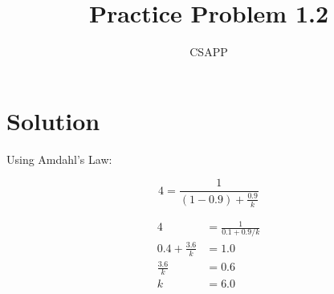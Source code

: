 \documentclass{article}
\title{Practice Problem 1.2}
\author{CSAPP}
\begin{document}
\maketitle

\section*{Solution}

Using Amdahl's Law:

\begin{equation*}
    4 = \frac{1}{(1 - 0.9) + \frac{0.9}{k}}
\end{equation*}

\begin{align*}
    4 &= \frac{1}{0.1 + 0.9/k} \\
    0.4 + \frac{3.6}{k} &= 1.0 \\
    \frac{3.6}{k} &= 0.6 \\
    k &= 6.0
\end{align*}
\end{document}
